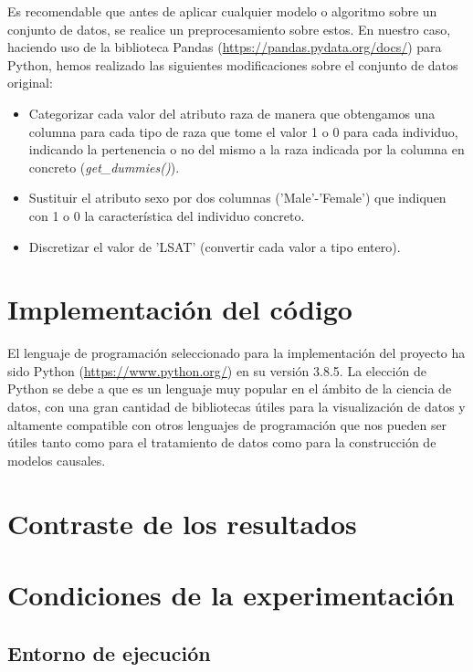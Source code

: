 \documentclass[oneside,openright,titlepage,numbers=noenddot,openany,headinclude,footinclude=true,
cleardoublepage=empty,abstractoff,BCOR=5mm,paper=a4,fontsize=12pt,main=spanish]{scrreprt}
\begin{document}
Es recomendable que antes de aplicar cualquier modelo o algoritmo sobre un conjunto de datos, se realice un preprocesamiento sobre estos. En nuestro caso, haciendo uso de la biblioteca Pandas (\url{https://pandas.pydata.org/docs/}) para Python, hemos realizado las siguientes modificaciones sobre el conjunto de datos original:

\begin{itemize}
    \item Categorizar cada valor del atributo raza de manera que obtengamos una columna para cada tipo de raza que tome el valor 1 o 0 para cada individuo, indicando la pertenencia o no del mismo a la raza indicada por la columna en concreto (\textit{get\_dummies()}).
    \item Sustituir el atributo sexo por dos columnas ('Male'-'Female') que indiquen con 1 o 0 la característica del individuo concreto.
    \item Discretizar el valor de 'LSAT' (convertir cada valor a tipo entero).
\end{itemize}

\section{Implementación del código}

El lenguaje de programación seleccionado para la implementación del proyecto ha sido Python (\url{https://www.python.org/}) en su versión 3.8.5. La elección de Python se debe a que es un lenguaje muy popular en el ámbito de la ciencia de datos, con una gran cantidad de bibliotecas útiles para la visualización de datos y altamente compatible con otros lenguajes de programación que nos pueden ser útiles tanto como para el tratamiento de datos como para la construcción de modelos causales.

\section{Contraste de los resultados}

\section{Condiciones de la experimentación}

\subsection{Entorno de ejecución}
\end{document}
